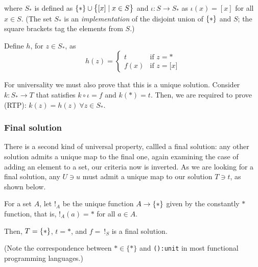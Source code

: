 where $S_\ast$ is defined as
$\{  \ast  \} \cup \big\{  \lbrack x\rbrack \mid x \in S  \big\}$
and $\iota: S \to S_\ast$ as $\iota(x)=[x]$ for all $x\in S$.
%
(The set $S_\ast$ is an \emph{implementation} of the disjoint union of
$\{ * \}$ and $S$; the square brackets tag the elements from $S$.)

Define $h$, for $z\in S_\ast$, as
\begin{equation*}
    h(z) = \begin{cases}
        t & \text{if } z = \ast\\
        f(x) & \text{if } z = \lbrack x \rbrack
    \end{cases}
\end{equation*}

For universality we must also prove that this is a unique solution.
Consider $k:S_\ast\to T$ that satisfies $k \circ \iota = f$ and
$k(\ast) = t$. Then, we are required to prove (RTP):
$k(z) = h(z)\ \forall z \in S_\ast$.

\subsubsection*{Final solution}

There is a second kind of universal property, callled a final solution: any
other solution admits a unique map to the final one, again examining the case
of adding an element to a set, our criteria now is inverted. As we are looking
for a final solution, any $U\ni u$ must admit a unique map to our solution
$T\ni t$, as shown below.
\begin{center}
\end{center}

For a set $A$, let $!_A$ be the unique function $A\to \{ \ast \}$ given by
the constantly $\ast$ function, that is, $!_A(a) = \ast$ for all $a\in A$.

Then, $T=\{ \ast \}$, $t=\ast$, and $f=\ !_S$ is a final solution.

(Note the correspondence between $\ast \in \{ \ast \}$ and \texttt{():unit}
in most functional programming languages.)

